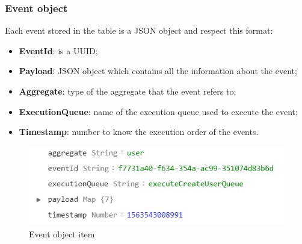 \subsubsection{Event object}
Each event stored in the table is a JSON object and respect this format:
\begin{itemize}
	\item \textbf{EventId}: is a UUID;
	\item \textbf{Payload}:	JSON object which contains all the information about the event;
	\item \textbf{Aggregate}: type of the aggregate that the event refers to;
	\item \textbf{ExecutionQueue}: name of the execution queue used to execute the event;
	\item \textbf{Timestamp}: number to know the execution order of the events.
\end{itemize}

\begin{figure} [H]
	\centering
	\includegraphics[scale=1.2]{../Img/event_object}
	\caption{Event object item}\label{}
\end{figure}


